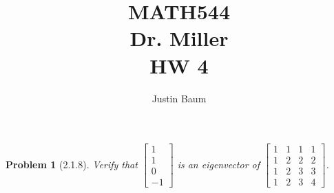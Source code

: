 \documentclass[12pt]{article}   %
\title{MATH544 \\ Dr. Miller \\ HW 4}
\author{Justin Baum}
\newtheorem{problem}{Problem}
\begin{document}
\maketitle
\begin{problem}[2.1.8]
Verify that $\begin{bmatrix}1 \\ 1 \\ 0 \\ -1 \end{bmatrix}$ is an eigenvector of $\begin{bmatrix}
1 & 1 & 1 & 1 \\
1 & 2 & 2 & 2 \\
1 & 2 & 3 & 3 \\
1 & 2 & 3 & 4
\end{bmatrix}$.
\end{problem}
\end{document}
